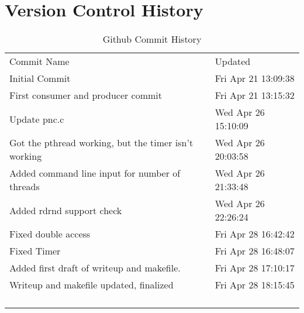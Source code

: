 \documentclass[letterpaper,10pt]{article}
\begin{document}
\section{Version Control History}
    \begin{table}[]
    \centering
    \caption{Github Commit History}
    \label{my-label}
    \begin{tabular}{ll}
    Commit Name                                          & Updated             \\
    Initial Commit                                       & Fri Apr 21 13:09:38 \\
    First consumer and producer commit                   & Fri Apr 21 13:15:32 \\
    Update pnc.c                                         & Wed Apr 26 15:10:09 \\
    Got the pthread working, but the timer isn't working & Wed Apr 26 20:03:58 \\
    Added command line input for number of threads       & Wed Apr 26 21:33:48 \\
    Added rdrnd support check                            & Wed Apr 26 22:26:24 \\
    Fixed double access                                  & Fri Apr 28 16:42:42 \\
    Fixed Timer                                          & Fri Apr 28 16:48:07 \\
    Added first draft of writeup and makefile.           & Fri Apr 28 17:10:17 \\
    Writeup and makefile updated, finalized              & Fri Apr 28 18:15:45 \\
                                                         &                     \\
                                                         &                     \\
                                                         &                     \\
                                                         &                    
    \end{tabular}
    \end{table}
\end{document}
